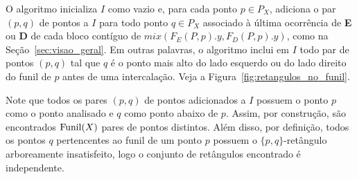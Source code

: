 O algoritmo inicializa $I$ como vazio e, para cada ponto $p \in P_X$, adiciona o par $(p,q)$ de pontos a $I$ para todo ponto $q \in P_X$ associado à última ocorrência de \textbf{E} ou \textbf{D} de cada bloco contíguo de $mix(F_E(P,p).y, F_D(P,p).y)$, como na Seção~\ref{sec:visao_geral}. Em outras palavras, o algoritmo inclui em $I$ todo par de pontos $(p,q)$ tal que $q$ é o ponto mais alto do lado esquerdo ou do lado direito do funil de $p$ antes de uma intercalação. Veja a Figura~\ref{fig:retangulos_no_funil}.

Note que todos os pares $(p,q)$ de pontos adicionados a $I$ possuem o ponto $p$ como o ponto analisado e $q$ como ponto abaixo de $p$. Assim, por construção, são encontrados $\mathrm{Funil}(X)$ pares de pontos distintos. Além disso, por definição, todos os pontos $q$ pertencentes ao funil de um ponto $p$ possuem o $\{p,q\}$-retângulo arboreamente insatisfeito, logo o conjunto de retângulos encontrado é independente.

